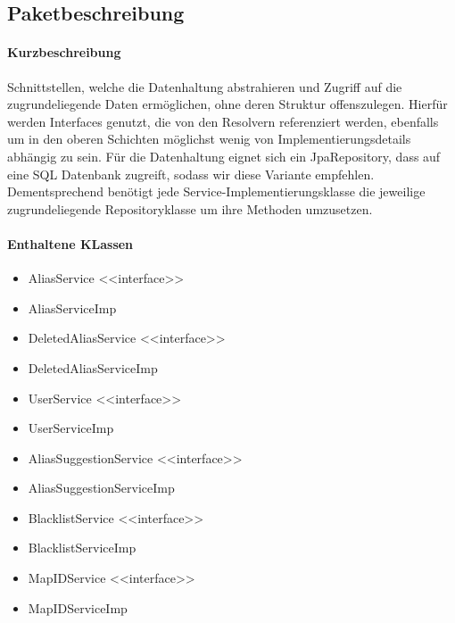 \subsection*{Paketbeschreibung}%
\paragraph*{Kurzbeschreibung}
Schnittstellen, welche die Datenhaltung abstrahieren und Zugriff auf die zugrundeliegende Daten ermöglichen, ohne deren Struktur offenszulegen.
Hierfür werden Interfaces genutzt, die von den Resolvern referenziert werden, ebenfalls um in den oberen Schichten möglichst 
wenig von Implementierungsdetails abhängig zu sein. Für die Datenhaltung eignet sich ein JpaRepository, dass auf 
eine SQL Datenbank zugreift, sodass wir diese Variante empfehlen. Dementsprechend benötigt jede Service-Implementierungsklasse die jeweilige 
zugrundeliegende Repositoryklasse um ihre Methoden umzusetzen. 
\paragraph*{Enthaltene KLassen}
\begin{itemize}
    \item AliasService <<interface>>
    \item AliasServiceImp
    \item DeletedAliasService <<interface>>
    \item DeletedAliasServiceImp
    \item UserService <<interface>>
    \item UserServiceImp
    \item AliasSuggestionService <<interface>>
    \item AliasSuggestionServiceImp
    \item BlacklistService <<interface>>
    \item BlacklistServiceImp
    \item MapIDService <<interface>>
    \item MapIDServiceImp
\end{itemize}

